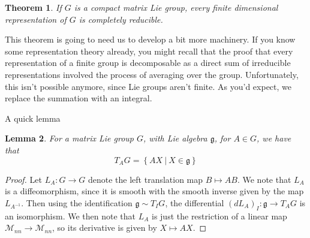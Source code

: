 \documentclass[psamsfonts]{amsart}
\newtheorem{thm}{Theorem}[section]
\newtheorem{lem}[thm]{Lemma}
\theoremstyle{definition}
\theoremstyle{remark}
\newcommand{\M}{\mathcal{M}}
\newcommand{\g}{\mathfrak{g}}
\newcommand{\inv}{^{-1}}
\newcommand{\set}[1]{\left\lbrace#1 \right\rbrace}
\begin{document}
\begin{thm}
If $G$ is a compact matrix Lie group, every finite dimensional representation of $G$ is completely reducible.
\end{thm}

This theorem is going to need us to develop a bit more machinery. If you know some representation theory already, you might recall that the proof that every representation of a finite group is decomposable as a direct sum of irreducible representations involved the process of averaging over the group. Unfortunately, this isn't possible anymore, since Lie groups aren't finite. As you'd expect, we replace the summation with an integral.

A quick lemma
\begin{lem}
For a \emph{matrix} Lie group $G$, with Lie algebra $\g$, for $A \in G$, we have that 
$$T_AG =\set{AX~|~ X \in \g}$$
\end{lem}

\begin{proof}
Let $L_A: G\to G$ denote the left translation map $B \mapsto AB$. We note that $L_A$ is a diffeomorphism, since it is smooth with the smooth inverse given by the map $L_{A\inv}$. Then using the identification $\g \sim T_IG$, the differential $(dL_A)_I: \g \to T_AG$ is an isomorphism. We then note that $L_A$ is just the restriction of a linear map $\M_{nn}\to \M_{nn}$, so its derivative is given by $X \mapsto AX$.
\end{proof}
\end{document}
